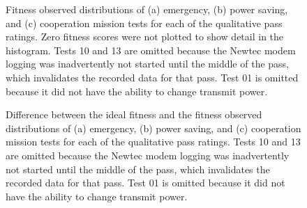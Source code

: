 \documentclass[journal]{IEEEtran}
\let\MYoriglatexcaption\caption
\renewcommand{\caption}[2][\relax]{\MYoriglatexcaption[#2]{#2}}
\begin{document}
\begin{figure}[!htbp]
	\centering
 	\hfill
 	\hfill
 	\caption{Fitness observed distributions of (a) emergency, (b) power saving, and (c) cooperation mission tests for each of the qualitative pass ratings.  Zero fitness scores were not plotted to show detail in the histogram.  Tests 10 and 13 are omitted because the Newtec modem logging was inadvertently not started until the middle of the pass, which invalidates the recorded data for that pass.  Test 01 is omitted because it did not have the ability to change transmit power.}
 	\label{fig:histoplots_by_mission}
\end{figure}
\begin{figure}[!htbp]
	\centering
 	\hfill
 	\hfill
 	\caption{Difference between the ideal fitness and the fitness observed distributions of (a) emergency, (b) power saving, and (c) cooperation mission tests for each of the qualitative pass ratings.  Tests 10 and 13 are omitted because the Newtec modem logging was inadvertently not started until the middle of the pass, which invalidates the recorded data for that pass.  Test 01 is omitted because it did not have the ability to change transmit power.} 	\label{fig:opt_histoplots_by_mission}
\end{figure}
\end{document}
